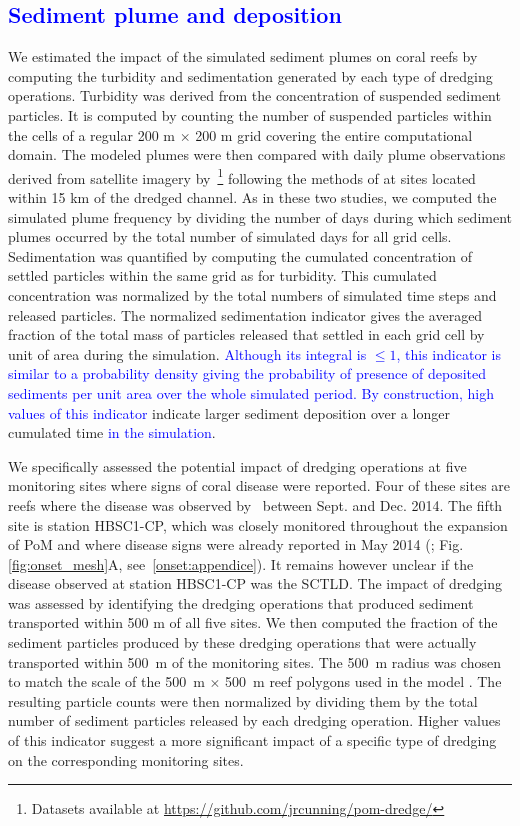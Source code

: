 \documentclass[preprint,12pt,authoryear]{elsarticle}
\newcommand{\modif}[1]{\textcolor{blue}{#1}}
\begin{document}
\modif{\subsection{Sediment plume and deposition}}

We estimated the impact of the simulated sediment plumes on coral reefs by computing the turbidity and sedimentation generated by each type of dredging operations. Turbidity was derived from the concentration of suspended sediment particles. It is computed by counting the number of suspended particles within the cells of a regular 200 m $\times$ 200 m grid covering the entire computational domain. The modeled plumes were then compared with daily plume observations derived from satellite imagery by~\cite{cunning2019extensive}\footnote{Datasets available at \url{https://github.com/jrcunning/pom-dredge/}} following the methods of \cite{barnes2015sediment} at sites located within 15 km of the dredged channel. As in these two studies, we computed the simulated plume frequency by dividing the number of days during which sediment plumes occurred by the total number of simulated days for all grid cells. Sedimentation was quantified by computing the cumulated concentration of settled particles within the same grid as for turbidity. This cumulated concentration was normalized by the total numbers of simulated time steps and released particles. The normalized sedimentation indicator gives the averaged fraction of the total mass of particles released that settled in each grid cell by unit of area during the simulation. \modif{Although its integral is $\leq 1$, this indicator is similar to a probability density giving the probability of presence of deposited sediments per unit area over the whole simulated period. By construction, high values of this indicator} indicate larger sediment deposition over a longer cumulated time \modif{in the simulation}.

We specifically assessed the potential impact of dredging operations at five monitoring sites where signs of coral disease were reported. Four of these sites are reefs where the disease was observed by~\cite{precht2016unprecedented} between Sept. and Dec. 2014. The fifth site is station HBSC1-CP, which was closely monitored throughout the expansion of PoM and where disease signs were already reported in May 2014 (\citealp{dial2017}; Fig. \ref{fig:onset_mesh}A, see~\ref{onset:appendice}). It remains however unclear if the disease observed at station HBSC1-CP was the SCTLD. The impact of dredging was assessed by identifying the dredging operations that produced sediment transported within 500 m of all five sites. We then computed the fraction of the sediment particles produced by these dredging operations that were actually transported within 500~m of the monitoring sites. The 500~m radius was chosen to match the scale of the 500~m $\times$ 500~m reef polygons used in the model \citep{dobbelaere2020coupled}. The resulting particle counts were then normalized by dividing them by the total number of sediment particles released by each dredging operation. Higher values of this indicator suggest a more significant impact of a specific type of dredging on the corresponding monitoring sites.
\end{document}
